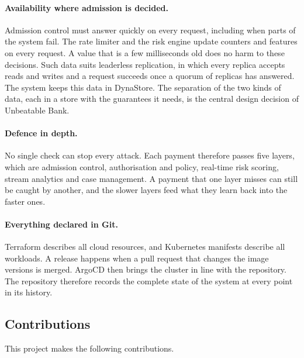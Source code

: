 \documentclass[11pt,a4paper]{article}
\newcommand{\project}{Unbeatable Bank}
\begin{document}
\paragraph{Availability where admission is decided.} Admission control must answer quickly on every request, including when parts of the system fail. The rate limiter and the risk engine update counters and features on every request. A value that is a few milliseconds old does no harm to these decisions. Such data suits leaderless replication, in which every replica accepts reads and writes and a request succeeds once a quorum of replicas has answered. The system keeps this data in DynaStore. The separation of the two kinds of data, each in a store with the guarantees it needs, is the central design decision of \project{}.

\paragraph{Defence in depth.} No single check can stop every attack. Each payment therefore passes five layers, which are admission control, authorisation and policy, real-time risk scoring, stream analytics and case management. A payment that one layer misses can still be caught by another, and the slower layers feed what they learn back into the faster ones.

\paragraph{Everything declared in Git.} Terraform describes all cloud resources, and Kubernetes manifests describe all workloads. A release happens when a pull request that changes the image versions is merged. ArgoCD then brings the cluster in line with the repository. The repository therefore records the complete state of the system at every point in its history.

\subsection{Contributions}
\label{sec:contributions}

This project makes the following contributions.
\end{document}

